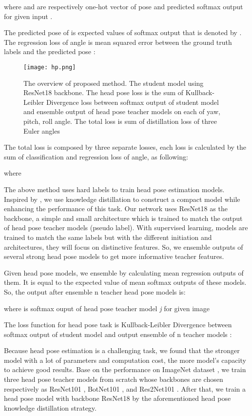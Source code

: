 \documentclass[a4paper,twoside]{article}
\begin{document}
where  and  are respectively one-hot vector of pose and predicted softmax output for given input .

The predicted pose of  is expected values of softmax output that is denoted by . The regression loss of angle is mean squared error between the ground truth labels  and the predicted pose :


\begin{figure*}[htp]
    \centering
    \texttt{[image: hp.png]}
    \caption{The overview of proposed method. The student model using ResNet18 backbone. The head pose loss is the sum of Kullback-Leibler Divergence loss between softmax output of student model and ensemble output of head pose teacher models on each of yaw, pitch, roll angle. The total loss is sum of distillation loss of three Euler angles}
    \label{fig:galaxy}
\end{figure*}

The total loss is composed by three separate losses, each loss is calculated by the sum of classification and regression loss of angle, as following:

where \textit{}

The above method uses hard labels to train head pose estimation models. Inspired by \cite{hinton2015distilling}, we use knowledge distillation to construct a compact model while enhancing the performance of this task. Our network uses ResNet18 \cite{he2016deep} as the backbone, a simple and small architecture which is trained to match the output of head pose teacher models (pseudo label). With supervised learning, models are trained to match the same labels but with the different initiation and architectures, they will focus on distinctive features. So, we ensemble outputs of several strong head pose models to get more informative teacher features.

Given \textit{} head pose models, we ensemble by calculating mean regression outputs of them. It is equal to the expected value of mean softmax outputs of these models. So, the output after ensemble n teacher head pose models is:

where  is softmax ouput of head pose teacher model \textit{j} for given image 

The loss function for head pose task is Kullback-Leibler Divergence between softmax output of student model  and output ensemble of n teacher models :


Because head pose estimation is a challenging task, we found that the stronger model with a lot of parameters and computation cost, the more model's capacity to achieve good results. Base on the performance on ImageNet dataset \cite{deng2009imagenet}, we train three head pose teacher models from scratch whose backbones are chosen respectively as ResNet101 \cite{he2016deep}, BotNet101 \cite{srinivas2021bottleneck}, and Res2Net101 \cite{gao2019res2net}. After that, we train a head pose model with backbone ResNet18 by the aforementioned head pose knowledge distillation strategy. 
\end{document}
